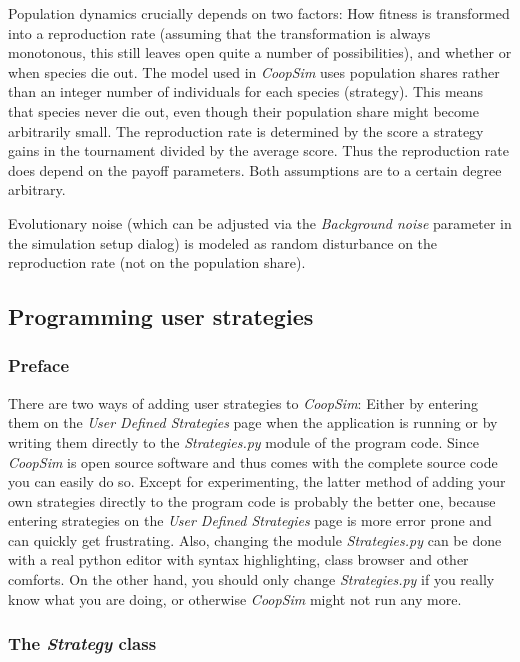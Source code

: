 \documentclass[12pt,a4paper,USenglish]{article}
\begin{document}
Population dynamics crucially depends on two factors: How fitness
is transformed into a reproduction rate (assuming that the transformation
is always monotonous, this still leaves open quite a number of possibilities),
and whether or when species die out. The model used in \emph{CoopSim}
uses population shares rather than an integer number of individuals
for each species (strategy). This means that species never die out,
even though their population share might become arbitrarily small.
The reproduction rate is determined by the score a strategy gains
in the tournament divided by the average score. Thus the reproduction
rate does depend on the payoff parameters. Both assumptions
are to a certain degree arbitrary.

Evolutionary noise (which can be adjusted via the \emph{Background
noise} parameter in the simulation setup dialog) is modeled as random
disturbance on the reproduction rate (not on the population share).



\subsection{Programming user strategies}


\subsubsection{Preface}

There are two ways of adding user strategies to \emph{CoopSim}: Either by
entering them on the \emph{User Defined Strategies} page when the application
is running or by writing them directly to the \emph{Strategies.py} module of
the program code. Since \emph{CoopSim} is open source software and thus comes
with the complete source code you can easily do so. Except for experimenting,
the latter method of adding your own strategies directly to the program code
is probably the better one, because entering strategies on the \emph{User
Defined Strategies} page is more error prone and can quickly get frustrating.
Also, changing the module \emph{Strategies.py} can be done with a real python
editor with syntax highlighting, class browser and other comforts. On the
other hand, you should only change \emph{Strategies.py} if you really know
what you are doing, or otherwise \emph{CoopSim} might not run any more.


\subsubsection{The \emph{Strategy} class}
\end{document}
